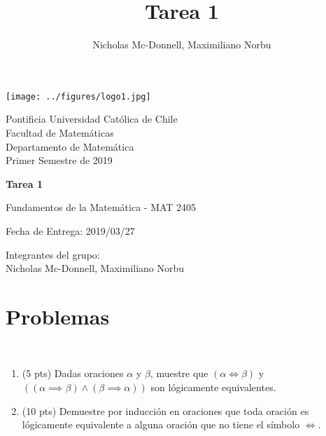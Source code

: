 

\title{Tarea 1}
\author{Nicholas Mc-Donnell, Maximiliano Norbu}


\begin{minipage}{2.5cm}
    \texttt{[image: ../figures/logo1.jpg]}
\end{minipage}
\begin{minipage}{13cm}
    \begin{flushleft}
        \raggedright
        {
            \noindent
            {\sc Pontificia Universidad Católica de Chile\\
                Facultad de Matemáticas\\
                Departamento de Matemática} \smallskip \\
            Primer Semestre de 2019\\
        }
    \end{flushleft}
\end{minipage}

\vspace{2ex}
{\Large \centerline{\bf Tarea 1}}
{\large \centerline{Fundamentos de la Matemática - MAT 2405}}
\centerline{Fecha de Entrega: 2019/03/27}

\begin{flushright}
    Integrantes del grupo:\\
    Nicholas Mc-Donnell, Maximiliano Norbu
\end{flushright}

\section*{Problemas}

\begin{prob}[15 pts]
    \
    \begin{enumerate}[label=(\alph*)]
        \item (5 pts) Dadas oraciones $\alpha$ y $\beta$, muestre que $(\alpha \iff \beta)$ y $((\alpha \implies \beta) \wedge (\beta \implies \alpha))$ son lógicamente equivalentes.
        \item (10 pts) Demuestre por inducción en oraciones que toda oración es lógicamente equivalente a alguna oración que no tiene el símbolo $\iff$.
    \end{enumerate}
\end{prob}

